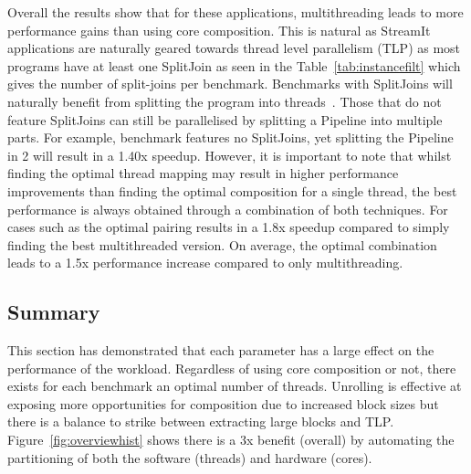 Overall the results show that for these applications, multithreading leads to more performance gains than using core composition.
This is natural as StreamIt applications are naturally geared towards thread level parallelism (TLP) as most programs have at least one SplitJoin as seen in the Table~\ref{tab:instancefilt} which gives the number of split-joins per benchmark.
Benchmarks with SplitJoins will naturally benefit from splitting the program into threads~\cite{thiesStreamit2010}.
Those that do not feature SplitJoins can still be parallelised by splitting a Pipeline into multiple parts.
For example, benchmark  features no SplitJoins, yet splitting the Pipeline in 2 will result in a 1.40x speedup.
However, it is important to note that whilst finding the optimal thread mapping may result in higher performance improvements than finding the optimal composition for a single thread, the best performance is always obtained through a combination of both techniques.
For cases such as  the optimal pairing results in a 1.8x speedup compared to simply finding the best multithreaded version.
On average, the optimal combination leads to a 1.5x performance increase compared to only multithreading.

\subsection{Summary}
This section has demonstrated that each parameter has a large effect on the performance of the workload.
Regardless of using core composition or not, there exists for each benchmark an optimal number of threads.
Unrolling is effective at exposing more opportunities for composition due to increased block sizes but there is a balance to strike between extracting large blocks and TLP.
Figure~\ref{fig:overviewhist} shows there is a 3x benefit (overall) by automating the partitioning of both the software (threads) and hardware (cores).

